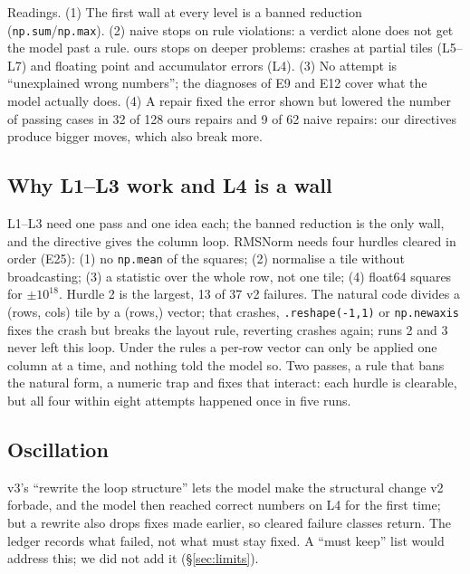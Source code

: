 \documentclass[11pt]{article}
\newcommand{\code}[1]{\texttt{#1}}
\newcommand{\E}[1]{E#1}
\begin{document}
\begin{table}[h]
\centering
\resizebox{\linewidth}{!}{}
\caption{Failed attempts by mode (\code{scripts/taxonomy.py}).}
\label{tab:tax}
\end{table}

\noindent Readings. (1) The first wall at every level is a banned reduction (\code{np.sum}/\code{np.max}).
(2) naive stops on rule violations: a verdict alone does not get the model past a rule. ours stops on
deeper problems: crashes at partial tiles (L5--L7) and floating point and accumulator errors (L4).
(3) No attempt is ``unexplained wrong numbers''; the diagnoses of \E{9} and \E{12} cover what the model
actually does. (4) A repair fixed the error shown but lowered the number of passing cases in 32 of 128
ours repairs and 9 of 62 naive repairs: our directives produce bigger moves, which also break more.

\subsection{Why L1--L3 work and L4 is a wall}
L1--L3 need one pass and one idea each; the banned reduction is the only wall, and the directive gives
the column loop. RMSNorm needs four hurdles cleared in order (\E{25}): (1) no \code{np.mean} of the
squares; (2) normalise a tile without broadcasting; (3) a statistic over the whole row, not one tile;
(4) float64 squares for $\pm10^{18}$. Hurdle 2 is the largest, 13 of 37 v2 failures. The natural code
divides a (rows, cols) tile by a (rows,) vector; that crashes, \code{.reshape(-1,1)} or
\code{np.newaxis} fixes the crash but breaks the layout rule, reverting crashes again; runs 2 and 3 never
left this loop. Under the rules a per-row vector can only be applied one column at a time, and nothing
told the model so. Two passes, a rule that bans the natural form, a numeric trap and fixes that interact:
each hurdle is clearable, but all four within eight attempts happened once in five runs.

\subsection{Oscillation}
v3's ``rewrite the loop structure'' lets the model make the structural change v2 forbade, and the
model then reached correct numbers on L4 for the first time; but a rewrite also drops fixes made
earlier, so cleared failure classes return. The ledger records what failed, not what must stay fixed.
A ``must keep'' list would address this; we did not add it (\S\ref{sec:limits}).
\end{document}
